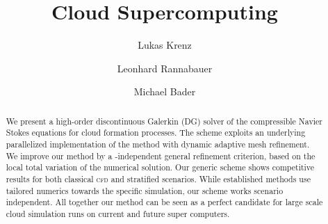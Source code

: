 \documentclass[runningheads]{llncs}
\title{Cloud Supercomputing}
\author{Lukas Krenz\inst{1} \and{} Leonhard Rannabauer\inst{1} \and{} Michael Bader\inst{1}}
\institute{Technical University of Munich} %
\begin{document}
\maketitle 
\begin{abstract}
  We present a high-order discontinuous Galerkin (DG) solver of the compressible Navier Stokes equations for cloud formation processes.
  The scheme exploits an underlying parallelized implementation of the \aderdg{} method with dynamic adaptive mesh refinement. 
  We improve our method by a \pde-independent general refinement criterion, based on the local total variation of the numerical solution.
  Our generic scheme shows competitive results for both classical \textsc{cfd} and stratified scenarios.
  While established methods use tailored numerics towards the specific simulation, our scheme works scenario independent.
  All together our method can be seen as a perfect candidate for large scale cloud simulation runs on current and future super computers.

  

\end{abstract}
\end{document}
